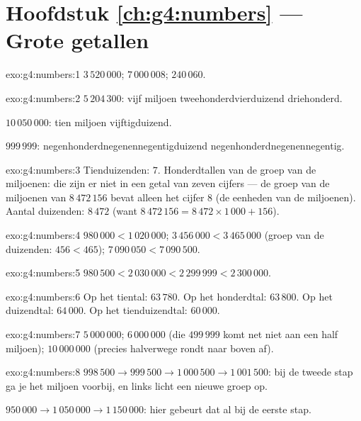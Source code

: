 \section*{Hoofdstuk \ref{ch:g4:numbers} --- Grote getallen}

\begin{solution}{exo:g4:numbers:1}
$3\,520\,000$; \quad $7\,000\,008$; \quad $240\,060$.
\end{solution}

\begin{solution}{exo:g4:numbers:2}
$5\,204\,300$: vijf miljoen tweehonderdvierduizend driehonderd.

$10\,050\,000$: tien miljoen vijftigduizend.

$999\,999$: negenhonderdnegenennegentigduizend
negenhonderdnegenennegentig.
\end{solution}

\begin{solution}{exo:g4:numbers:3}
Tienduizenden: $7$. Honderdtallen van de groep van de miljoenen: die zijn
er niet in een getal van zeven cijfers --- de groep van de miljoenen van
$8\,472\,156$ bevat alleen het cijfer $8$ (de eenheden van de miljoenen).
Aantal duizenden: $8\,472$ (want
$8\,472\,156 = 8\,472 \times 1\,000 + 156$).
\end{solution}

\begin{solution}{exo:g4:numbers:4}
$980\,000 < 1\,020\,000$; \quad
$3\,456\,000 < 3\,465\,000$ (groep van de duizenden: $456 < 465$); \quad
$7\,090\,050 < 7\,090\,500$.
\end{solution}

\begin{solution}{exo:g4:numbers:5}
$980\,500 < 2\,030\,000 < 2\,299\,999 < 2\,300\,000$.
\end{solution}

\begin{solution}{exo:g4:numbers:6}
Op het tiental: $63\,780$. Op het honderdtal: $63\,800$. Op het
duizendtal: $64\,000$. Op het tienduizendtal: $60\,000$.
\end{solution}

\begin{solution}{exo:g4:numbers:7}
$5\,000\,000$; \quad $6\,000\,000$ (die $499\,999$ komt net niet aan een
half miljoen); \quad $10\,000\,000$ (precies halverwege rondt naar boven
af).
\end{solution}

\begin{solution}{exo:g4:numbers:8}
$998\,500 \to 999\,500 \to 1\,000\,500 \to 1\,001\,500$: bij de tweede
stap ga je het miljoen voorbij, en links licht een nieuwe groep op.

$950\,000 \to 1\,050\,000 \to 1\,150\,000$: hier gebeurt dat al bij de
eerste stap.
\end{solution}

